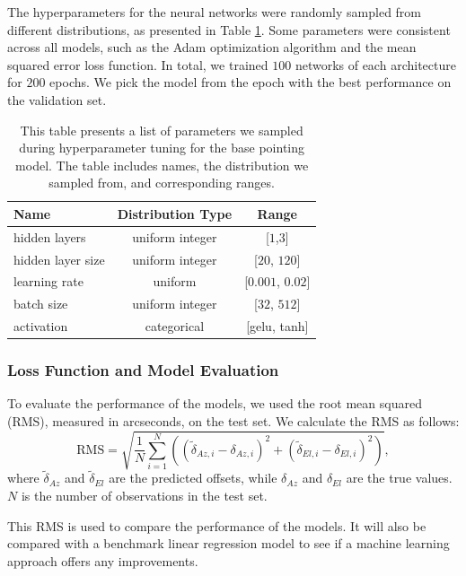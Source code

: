 The hyperparameters for the neural networks were randomly sampled from different distributions, as presented in Table \ref{tab:nn_hyperparameters}.
Some parameters were consistent across all models, such as the Adam optimization algorithm and the mean squared error loss function.
In total, we trained $100$ networks of each architecture for $200$ epochs.
We pick the model from the epoch with the best performance on the validation set.
\begin{table}[H]
    \centering
    \caption{This table presents a list of parameters we sampled during hyperparameter tuning for the base pointing model. The table includes names, the distribution we sampled from, and corresponding ranges.}
    \begin{tabular}{lcc}
    \hline
    \textbf{Name} & \textbf{Distribution Type} & \textbf{Range} \\ \hline
    hidden layers & uniform integer & [$1$,$3$] \\
    hidden layer size & uniform integer & [$20$, $120$] \\
    learning rate & uniform & [$0.001$, $0.02$] \\
    batch size & uniform integer & [$32$, $512$] \\
    activation & categorical & [gelu, tanh] \\ \hline
    \end{tabular}
    \label{tab:nn_hyperparameters}
    \end{table}

\subsubsection{Loss Function and Model Evaluation}
To evaluate the performance of the models, we used the root mean squared (RMS), measured in arcseconds, on the test set.
We calculate the RMS as follows:
\begin{equation}
    \text{RMS} = \sqrt{ \frac{1}{N} \sum_{i=1}^N \left( (\tilde{\delta}_{Az,i} - \delta_{Az,i})^2 + (\tilde{\delta}_{El,i} - \delta_{El,i})^2 \right)},
\end{equation}
where $\tilde{\delta}_{Az}$ and $\tilde{\delta}_{El}$ are the predicted offsets, while $\delta_{Az}$ and $\delta_{El}$ are the true values.
$N$ is the number of observations in the test set.

This RMS is used to compare the performance of the models.
It will also be compared with a benchmark linear regression model to see if a machine learning approach offers any improvements.